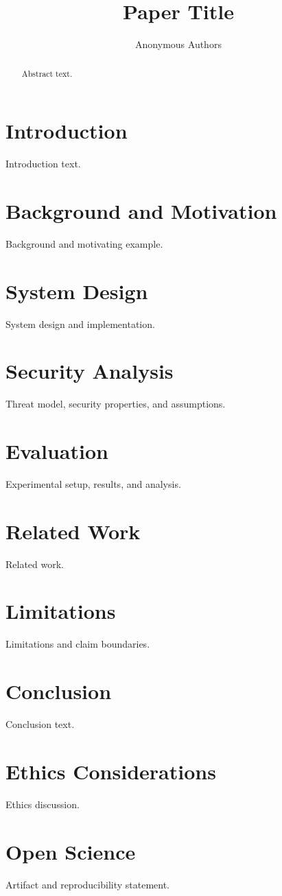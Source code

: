 \documentclass[letterpaper,twocolumn,10pt]{article}
\title{Paper Title}
\author{Anonymous Authors}
\date{}
\begin{document}
\maketitle

\begin{abstract}
Abstract text.
\end{abstract}

\section{Introduction}
Introduction text.

\section{Background and Motivation}
Background and motivating example.

\section{System Design}
System design and implementation.

\section{Security Analysis}
Threat model, security properties, and assumptions.

\section{Evaluation}
Experimental setup, results, and analysis.

\section{Related Work}
Related work.

\section{Limitations}
Limitations and claim boundaries.

\section{Conclusion}
Conclusion text.




\appendix
\section{Ethics Considerations}
Ethics discussion.

\section{Open Science}
Artifact and reproducibility statement.
\end{document}
